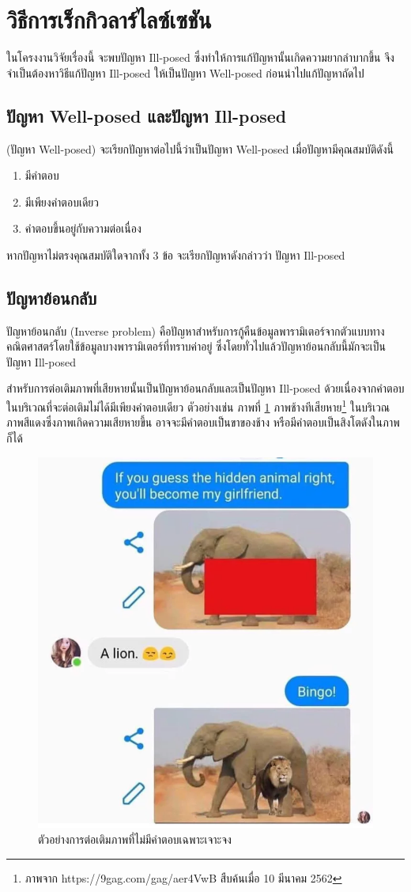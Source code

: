 \section{วิธีการเร็กกิวลาร์ไลซ์เซชัน}

\hspace{1cm} ในโครงงานวิจัยเรื่องนี้ จะพบปัญหา Ill-posed ซึ่งทำให้การแก้ปัญหานั้นเกิดความยากลำบากขึ้น จึงจำเป็นต้องหาวิธีแก้ปัญหา Ill-posed ให้เป็นปัญหา Well-posed ก่อนนำไปแก้ปัญหาถัดไป

\subsection{ปัญหา Well-posed และปัญหา Ill-posed}

\begin{Definition}
    (ปัญหา Well-posed) จะเรียกปัญหาต่อไปนี้ว่าเป็นปัญหา Well-posed เมื่อปัญหามีคุณสมบัติดังนี้
    \begin{enumerate}
        \item มีคำตอบ
        \item มีเพียงคำตอบเดียว
        \item คำตอบขึ้นอยู่กับความต่อเนื่อง
    \end{enumerate}    
    หากปัญหาไม่ตรงคุณสมบัติใดจากทั้ง 3 ข้อ จะเรียกปัญหาดังกล่าวว่า ปัญหา Ill-posed
\end{Definition}

\subsection{ปัญหาย้อนกลับ}
\hspace{1cm}ปัญหาย้อนกลับ (Inverse problem) คือปัญหาสำหรับการกู้คืนข้อมูลพารามิเตอร์จากตัวแบบทางคณิตศาสตร์โดยใช้ข้อมูลบางพารามิเตอร์ที่ทราบค่าอยู่ ซึ่งโดยทั่วไปแล้วปัญหาย้อนกลับนี้มักจะเป็นปัญหา Ill-posed

\hspace{1cm} สำหรับการต่อเติมภาพที่เสียหายนั้นเป็นปัญหาย้อนกลับและเป็นปัญหา Ill-posed ด้วยเนื่องจากคำตอบในบริเวณที่จะต่อเติมไม่ได้มีเพียงคำตอบเดียว ตัวอย่างเช่น ภาพที่ \ref{image:meme_elephant} ภาพช้างทีเสียหาย\footnote{ภาพจาก https://9gag.com/gag/aer4VwB สืบค้นเมื่อ 10 มีนาคม 2562} ในบริเวณภาพสีแดงซึ่งภาพเกิดความเสียหายขึ้น อาจจะมีคำตอบเป็นขาของช้าง หรือมีคำตอบเป็นสิงโตดังในภาพก็ได้

\begin{figure}[H]
    \centering
    \includegraphics[width=0.35\linewidth]{image/meme_elephant.png}
    \caption[a]{ตัวอย่างการต่อเติมภาพที่ไม่มีคำตอบเฉพาะเจาะจง}
    \label{image:meme_elephant}
\end{figure}

